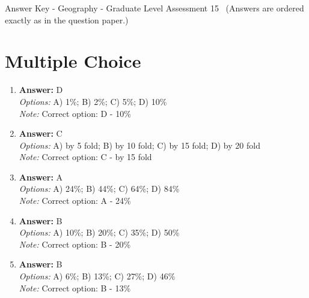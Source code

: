 \documentclass[12pt]{article}
\begin{document}
\begin{center}
Answer Key - Geography - Graduate Level Assessment 15 \
\small (Answers are ordered exactly as in the question paper.)
\end{center}

\section*{Multiple Choice}
\begin{enumerate}[label=\arabic*.]
\item \textbf{Answer:} D
\\ \textit{Options:} A) 1\%; B) 2\%; C) 5\%; D) 10\%
\\ \textit{Note:} Correct option: D - 10\%
\item \textbf{Answer:} C
\\ \textit{Options:} A) by 5 fold; B) by 10 fold; C) by 15 fold; D) by 20 fold
\\ \textit{Note:} Correct option: C - by 15 fold
\item \textbf{Answer:} A
\\ \textit{Options:} A) 24\%; B) 44\%; C) 64\%; D) 84\%
\\ \textit{Note:} Correct option: A - 24\%
\item \textbf{Answer:} B
\\ \textit{Options:} A) 10\%; B) 20\%; C) 35\%; D) 50\%
\\ \textit{Note:} Correct option: B - 20\%
\item \textbf{Answer:} B
\\ \textit{Options:} A) 6\%; B) 13\%; C) 27\%; D) 46\%
\\ \textit{Note:} Correct option: B - 13\%
\end{enumerate}
\end{document}
